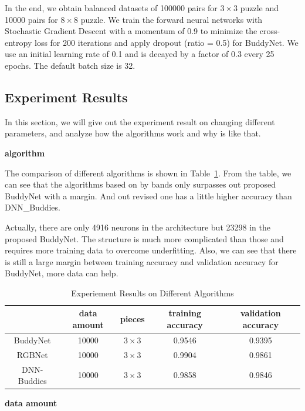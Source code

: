 \documentclass{article}
\begin{document}
In the end, we obtain balanced datasets of 100000 pairs for $3\times 3$ puzzle and 10000 pairs for  $8\times 8$ puzzle. We train the forward neural networks with Stochastic Gradient Descent with a momentum of 0.9 to minimize the cross-entropy loss for 200 iterations and apply dropout (ratio = 0.5) for BuddyNet. We use an initial learning rate of 0.1 and is decayed by a factor of 0.3 every 25 epochs. The default batch size is 32.

\subsection{Experiment Results}

In this section, we will give out the experiment result on changing different parameters, and analyze how the algorithms work and why is like that.

\textbf{algorithm}

The comparison of different algorithms is shown in Table~\ref{tab:expalg}. From the table, we can see that the algorithms based on by bands only surpasses out proposed BuddyNet with a margin. And out revised one has a little higher accuracy than DNN\_Buddies\cite{sholomon2016dnn}.

Actually, there are only 4916 neurons in the architecture but 23298 in the proposed BuddyNet. The structure is much more complicated than those and requires more training data to overcome underfitting. Also, we can see that there is still a large margin between training accuracy and validation accuracy for BuddyNet, more data can help.

\begin{table}
    \caption{Experiement Results on Different Algorithms}
    \centering
    \label{tab:expalg}
    \begin{tabular}{c|c|c|c|c}
        \hline
        & data amount & pieces & training accuracy & validation accuracy\\
        \hline
        BuddyNet & 10000 & $3\times 3$ & 0.9546 & 0.9395\\
        \hline
        RGBNet & 10000 & $3\times 3$ & 0.9904 & 0.9861\\
        \hline
        \hline
        DNN-Buddies \cite{sholomon2016dnn} & 10000 & $3\times 3$ & 0.9858 & 0.9846\\
        \hline
    \end{tabular}
\end{table}

\textbf{data amount}
\end{document}
